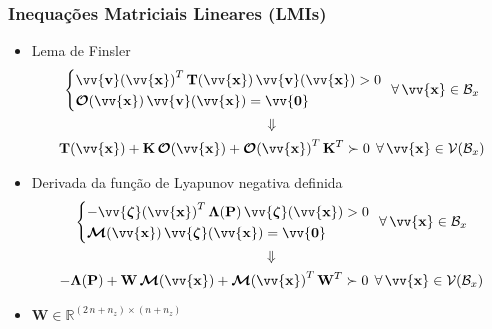 \documentclass{beamer}
\newcommand*{\Prod}{\,}
\newcommand*{\Bold}[1]{\boldsymbol{\mathbf{#1}}}
\newcommand*{\Matr}[1]{\Bold{#1}}
\newcommand*{\Vect}[1]{\vv{\Bold{#1}}}
\newcommand*{\Transp}[1]{{#1}^{T}}
\newcommand*{\ForAll}{\:\:\forall\,}
\newcommand*{\Vimplies}{\\\Downarrow\\}
\renewcommand{\Prod}{\,}
\begin{document}
\begin{frame}\frametitle{Inequações Matriciais Lineares (LMIs)}
  \begin{itemize}
    \item Lema de Finsler
    \begin{gather}
      \left\{\begin{aligned}
        &\Transp{\Vect{v}(\Vect{x})} \Prod \Matr{T}(\Vect{x}) \Prod \Vect{v}(\Vect{x}) > 0
        \\
        &\Matr{\mathcal{O}}(\Vect{x}) \Prod \Vect{v}(\Vect{x}) = \Vect{0}
      \end{aligned}\right.
      \ForAll \Vect{x} \in \mathcal{B}_x
      \Vimplies
      \Matr{T}(\Vect{x}) + \Matr{K} \Prod \Matr{\mathcal{O}}(\Vect{x}) + \Transp{\Matr{\mathcal{O}}(\Vect{x})} \Prod \Transp{\Matr{K}} \succ 0
      \ForAll \Vect{x} \in \mathcal{V}(\mathcal{B}_x)
    \end{gather}
    \item Derivada da função de Lyapunov negativa definida
    \begin{gather}
      \left\{\begin{aligned}
        &{-\Transp{\Vect{\zeta}(\Vect{x})}} \Prod \Matr{\Lambda}(\Matr{P}) \Prod \Vect{\zeta}(\Vect{x}) > 0
        \\
        &\Matr{\mathcal{M}}(\Vect{x}) \Prod \Vect{\zeta}(\Vect{x}) = \Vect{0}
      \end{aligned}\right.
      \ForAll \Vect{x} \in \mathcal{B}_x
      \Vimplies
      -\Matr{\Lambda}(\Matr{P}) + \Matr{W} \Prod \Matr{\mathcal{M}}(\Vect{x}) + \Transp{\Matr{\mathcal{M}}(\Vect{x})} \Prod \Transp{\Matr{W}} \succ 0
      \ForAll \Vect{x} \in \mathcal{V}(\mathcal{B}_x)
    \end{gather}
    \item $\Matr{W} \in \mathbb{R}^{(2 \Prod n + n_z) \times (n + n_z)}$
  \end{itemize}
\end{frame}
\end{document}
